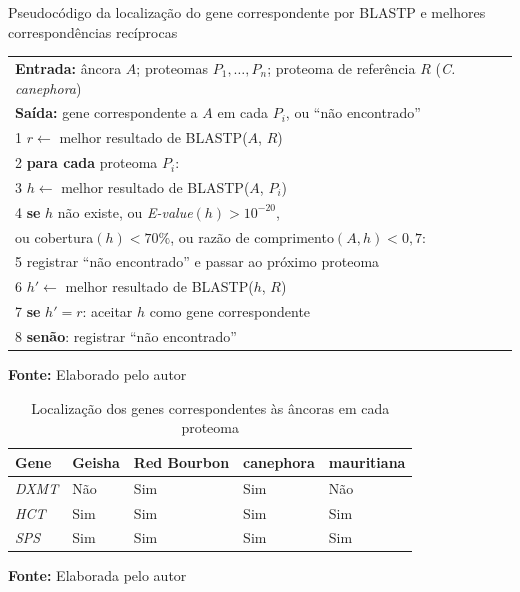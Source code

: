 \FloatBarrier
\begin{quadro}[!htbp]
	\centering
	\SingleSpacing\small
	\caption{Pseudocódigo da localização do gene correspondente por BLASTP e melhores correspondências recíprocas}
	\begin{tabular}{|p{}|}
		\hline
		\textbf{Entrada:} âncora $A$; proteomas $P_1, \ldots, P_n$; proteoma de referência $R$ (\textit{C. canephora}) \\
		\textbf{Saída:} gene correspondente a $A$ em cada $P_i$, ou ``não encontrado'' \\ \hline
		1\hspace{0.8em} $r \leftarrow$ melhor resultado de BLASTP($A$, $R$) \\
		2\hspace{0.8em} \textbf{para cada} proteoma $P_i$: \\
		3\hspace{2.2em} $h \leftarrow$ melhor resultado de BLASTP($A$, $P_i$) \\
		4\hspace{2.2em} \textbf{se} $h$ não existe, ou \textit{E-value}$(h) > 10^{-20}$, \\
		\hspace{3.6em} ou cobertura$(h) < 70\%$, ou razão de comprimento$(A, h) < 0{,}7$: \\
		5\hspace{3.6em} registrar ``não encontrado'' e passar ao próximo proteoma \\
		6\hspace{2.2em} $h' \leftarrow$ melhor resultado de BLASTP($h$, $R$) \\
		7\hspace{2.2em} \textbf{se} $h' = r$: aceitar $h$ como gene correspondente \\
		8\hspace{2.2em} \textbf{senão}: registrar ``não encontrado'' \\ \hline
	\end{tabular}
	\par\vspace{0.2cm}
	\textbf{Fonte:} Elaborado pelo autor
	\label{qua:rbh}
\end{quadro}
\FloatBarrier

\FloatBarrier
\begin{table}[!htbp]
	\centering
	\SingleSpacing\small
	\caption{Localização dos genes correspondentes às âncoras em cada proteoma}
	\begin{tabularx}{\textwidth}{@{}lYYYY@{}}
		\toprule
		\textbf{Gene} & \textbf{Geisha} & \textbf{Red Bourbon} & \textbf{canephora} & \textbf{mauritiana} \\
		\midrule
		\textit{DXMT} & Não & Sim & Sim & Não \\
		\textit{HCT}  & Sim & Sim & Sim & Sim \\
		\textit{SPS}  & Sim & Sim & Sim & Sim \\
		\bottomrule
	\end{tabularx}
	\par\vspace{0.2cm}
	\textbf{Fonte:} Elaborada pelo autor
	\label{tab:localizacao}
\end{table}
\FloatBarrier

